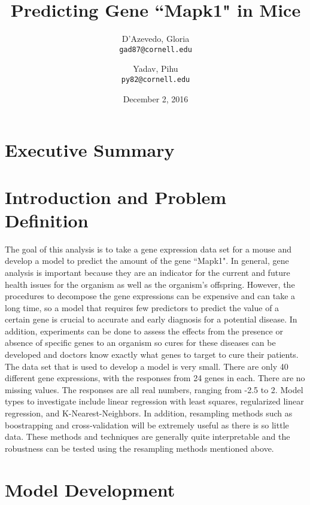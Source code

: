 \documentclass[letterpaper]{article}
\title{Predicting Gene ``Mapk1" in Mice}
\author{
  D'Azevedo, Gloria\\
  \texttt{gad87@cornell.edu}
  \and
  Yadav, Pihu\\
  \texttt{py82@cornell.edu}
}
\date{December 2, 2016}
\begin{document}
\maketitle

\section{Executive Summary}

\section{Introduction and Problem Definition}
The goal of this analysis is to take a gene expression data set for a mouse and develop a model to predict the amount of the gene ``Mapk1".  In general, gene analysis is important because they are an indicator for the current and future health issues for the organism as well as the organism's offspring.  However, the procedures to decompose the gene expressions can be expensive and can take
a long time, so a model that requires few predictors to predict the value of a certain gene is crucial to accurate and early diagnosis 
for a potential disease.  In addition, experiments can be done to assess the effects from the presence or absence of specific genes to an organism so cures for these diseases can be developed and doctors know exactly what genes to target to cure their patients.\\
%
The data set that is used to develop a model is very small.  There are only 40 different gene expressions, with the responses from 24 genes
in each.  There are no missing values.  The responses are all real numbers, ranging from -2.5 to 2.  Model types to investigate include linear regression with least squares, regularized linear regression, and K-Nearest-Neighbors.  In addition, resampling methods such as boostrapping and cross-validation will be extremely useful as there is so little data.  These methods and techniques are generally quite interpretable and the robustness can be tested using the resampling methods mentioned above.
%
\section{Model Development}
\end{document}
